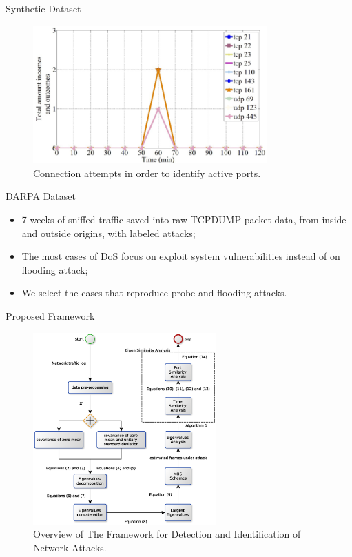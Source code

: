 \documentclass[newPxFont, numfooter, sectionpages]{beamer}
\begin{document}
\begin{frame}[c]{Synthetic Dataset}
	
	\begin{figure}[h!]
	     \centering 
	     \includegraphics[width=9cm]{../figures/fig07.png}
	     \caption{Connection attempts in order to identify active ports.}
	     \label{fig:2_fig7}
	\end{figure}

\end{frame}
\begin{frame}{DARPA Dataset}
	
	\begin{itemize}
		\item 7 weeks of sniffed traffic saved into raw TCPDUMP packet data, from inside and outside origins, with labeled attacks;
		\item The most cases of DoS focus on exploit system vulnerabilities instead of on flooding attack;
		\item We select the cases that reproduce probe and flooding attacks.
	\end{itemize}

\end{frame}
\begin{frame}{Proposed Framework}
	
	\begin{figure}[h!]
		\centering
	     \includegraphics[width=7cm]{../figures/mos_eigen_similarity.eps}
	     \caption{Overview of The Framework for Detection and Identification of Network Attacks.}
	     \label{fig:2_fig80}
	\end{figure}

\end{frame}
\end{document}
